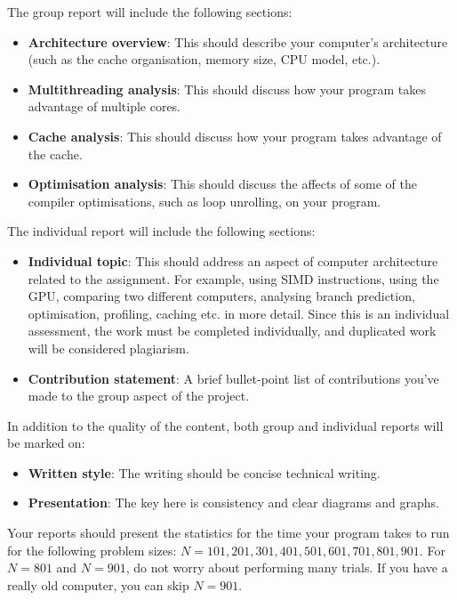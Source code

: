 \documentclass[a4paper,11pt]{article}
\begin{document}
The group report will include the following sections:

\begin{itemize}
\item \textbf{Architecture overview}:  This should describe your computer's
  architecture (such as the cache organisation, memory size, CPU model,
  etc.).

\item \textbf{Multithreading analysis}:  This should discuss how your program
  takes advantage of multiple cores.

\item \textbf{Cache analysis}:  This should discuss how your program takes
  advantage of the cache.

\item \textbf{Optimisation analysis}:  This should discuss the affects of some
  of the compiler optimisations, such as loop unrolling, on your
  program.
\end{itemize}

The individual report will include the following sections:
\begin{itemize}
\item \textbf{Individual topic}:  This should address an aspect of computer
  architecture related to the assignment.  For example, using SIMD
  instructions, using the GPU, comparing two different computers,
  analysing branch prediction, optimisation, profiling, caching
  etc. in more detail.  Since this is an individual assessment,
  the work must be completed individually, and duplicated work 
  will be considered plagiarism.
\item \textbf{Contribution statement}:  A brief bullet-point
list of contributions you've made to the group aspect of the project.
\end{itemize}

In addition to the quality of the content, both group and individual 
reports will be marked on:
\begin{itemize}
\item \textbf{Written style}:  The writing should be concise technical writing.

\item \textbf{Presentation}:  The key here is consistency and clear diagrams
  and graphs.
\end{itemize}


Your reports should present the statistics for the time your program
takes to run for the following problem sizes: $N=101, 201, 301, 401,
501, 601, 701, 801, 901$.  For $N=801$ and $N=901$, do not worry about
performing many trials.  If you have a really old computer, you can
skip $N=901$.
\end{document}
